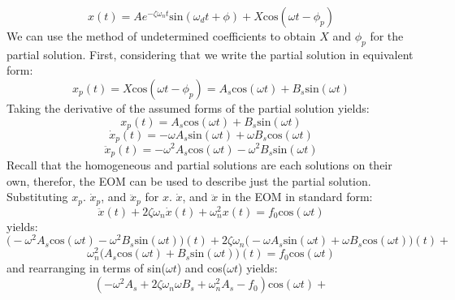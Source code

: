 \documentclass[12pt,letter]{article}
\numberwithin{ex}{section} %
\numberwithin{re}{section} %
\begin{document}
			\begin{equation}
				x(t) = Ae^{-\zeta \omega_n t}\text{sin}(\omega_d t + \phi) +  X \text{cos}(\omega t - \phi_p)
			\end{equation}			
			We can use the method of undetermined coefficients to obtain $X$ and $\phi_p$ for the partial solution. First, considering that we write the partial solution in equivalent form:
			\begin{equation}
				x_p(t) = X \text{cos}(\omega t - \phi_p) = A_s \text{cos}(\omega t) + B_s  \text{sin}(\omega t)
			\end{equation}			 
			Taking the derivative of the assumed forms of the partial solution yields:
			\begin{equation}
				x_p(t) = A_s \text{cos}(\omega t) + B_s  \text{sin}(\omega t)
			\end{equation}	
			\begin{equation}
				\dot{x}_p(t) = -\omega A_s \text{sin}(\omega t) + \omega B_s  \text{cos}(\omega t)
			\end{equation}				 
			\begin{equation}
				\ddot{x}_p(t) = -\omega^2 A_s \text{cos}(\omega t) - \omega^2 B_s  \text{sin}(\omega t)
			\end{equation}				
			Recall that the homogeneous and partial solutions are each solutions on their own, therefor, the EOM can be used to describe just the partial solution. Substituting $x_p$. $\dot{x}_p$, and $\ddot{x}_p$ for $x$. $\dot{x}$, and $\ddot{x}$ in the EOM in standard form:
			\begin{equation}
			 	\ddot{x}(t)+2 \zeta \omega_n \dot{x}(t) +\omega_n^2x(t) = f_0\text{cos}(\omega t)
			\end{equation}
			yields:
			\begin{equation}
			 	\big(	-\omega^2 A_s \text{cos}(\omega t) - \omega^2 B_s  \text{sin}(\omega t) \big)(t)+2 \zeta \omega_n  \big( -\omega A_s \text{sin}(\omega t) + \omega B_s  \text{cos}(\omega t)  \big) (t) +
			\end{equation}
			\begin{equation*}
				\omega_n^2 \big( A_s \text{cos}(\omega t) + B_s  \text{sin}(\omega t) \big)(t) = f_0\text{cos}(\omega t)
			\end{equation*}				
			and rearranging in terms of sin($\omega t$) and cos($\omega t$) yields: 
			\begin{equation}
				(-\omega^2 A_s + 2 \zeta \omega_n \omega B_s + \omega_n^2 A_s -f_0) \text{cos}(\omega t) + 
			\end{equation}
\end{document}
